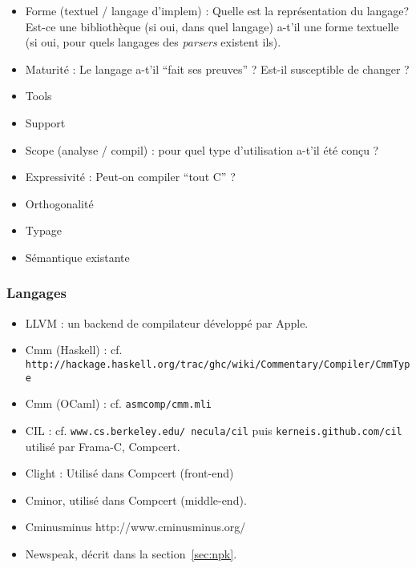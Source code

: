 \begin{itemize}
\item
  Forme (textuel / langage d'implem) : Quelle est la représentation du
  langage? Est-ce une bibliothèque (si oui, dans quel langage) a-t'il
  une forme textuelle (si oui, pour quels langages des \emph{parsers}
  existent ils).
\item
  Maturité : Le langage a-t'il ``fait ses preuves'' ? Est-il susceptible
  de changer ?
\item
  Tools
\item
  Support
\item
  Scope (analyse / compil) : pour quel type d'utilisation a-t'il été
  conçu ?
\item Expressivité : Peut-on compiler ``tout C'' ?
\item Orthogonalité
\item Typage
\item Sémantique existante
\end{itemize}

\subsubsection{Langages}

\begin{itemize}
\item
  LLVM\cite{llvm-pres} : un backend de compilateur développé par Apple.
\item
  Cmm (Haskell) : cf.
  \texttt{http://hackage.haskell.org/trac/ghc/wiki/Commentary/Compiler/CmmType}
\item
  Cmm (OCaml) : cf. \texttt{asmcomp/cmm.mli}
\item
  CIL\cite{NeculaCil} : cf. \texttt{www.cs.berkeley.edu/~necula/cil} puis
  \texttt{kerneis.github.com/cil} utilisé par Frama-C, Compcert.
\item
  Clight\cite{cfront} : Utilisé dans Compcert (front-end)
\item
  Cminor\cite{cminorSL}, utilisé dans Compcert (middle-end).
\item
  Cminusminus \cite{spjcmm} http://www.cminusminus.org/
\item
  Newspeak\cite{newspeak}, décrit dans la section~\ref{sec:npk}.
\end{itemize}

